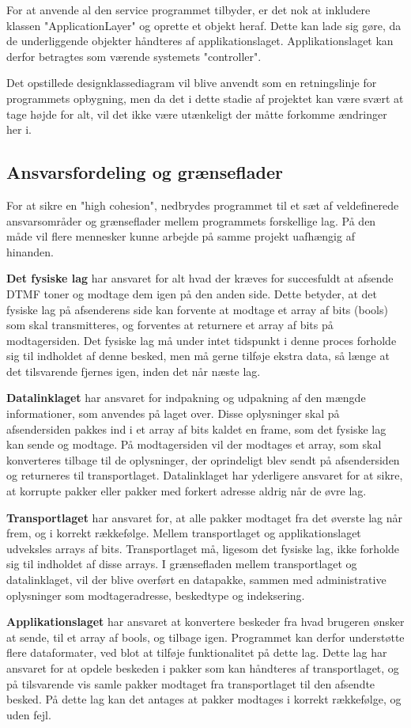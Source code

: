 For at anvende al den service programmet tilbyder, er det nok at inkludere klassen "ApplicationLayer" og oprette et objekt heraf. Dette kan lade sig gøre, da de underliggende objekter håndteres af applikationslaget. Applikationslaget kan derfor betragtes som værende systemets "controller".

Det opstillede designklassediagram vil blive anvendt som en retningslinje for programmets opbygning, men da det i dette stadie af projektet kan være svært at tage højde for alt, vil det ikke være utænkeligt der måtte forkomme ændringer her i.


\subsection{Ansvarsfordeling og grænseflader}
For at sikre en "high cohesion", nedbrydes programmet til et sæt af veldefinerede ansvarsområder og grænseflader mellem programmets forskellige lag. På den måde vil flere mennesker kunne arbejde på samme projekt uafhængig af hinanden.  

\textbf{Det fysiske lag} har ansvaret for alt hvad der kræves for succesfuldt at afsende DTMF toner og modtage dem igen på den anden side. Dette betyder, at det fysiske lag på afsenderens side kan forvente at modtage et array af bits (bools) som skal transmitteres, og forventes at returnere et array af bits på modtagersiden. Det fysiske lag må under intet tidspunkt i denne proces forholde sig til indholdet af denne besked, men må gerne tilføje ekstra data, så længe at det tilsvarende fjernes igen, inden det når næste lag.

\textbf{Datalinklaget} har ansvaret for indpakning og udpakning af den mængde informationer, som anvendes på laget over. Disse oplysninger skal på afsendersiden pakkes ind i et array af bits kaldet en frame, som det fysiske lag kan sende og modtage. På modtagersiden vil der modtages et array, som skal  konverteres tilbage til de oplysninger, der oprindeligt blev sendt på afsendersiden og returneres til transportlaget. 
Datalinklaget har yderligere ansvaret for at sikre, at korrupte pakker eller pakker med forkert adresse aldrig når de øvre lag.

\textbf{Transportlaget} har ansvaret for, at alle pakker modtaget fra det øverste lag når frem, og i korrekt rækkefølge. Mellem transportlaget og applikationslaget udveksles arrays af bits. Transportlaget må, ligesom det fysiske lag, ikke forholde sig til indholdet af disse arrays. I grænsefladen mellem transportlaget og datalinklaget, vil der blive overført en datapakke, sammen med administrative oplysninger som modtageradresse, beskedtype og indeksering. 

\textbf{Applikationslaget} har ansvaret at konvertere beskeder fra hvad brugeren ønsker at sende, til et array af bools, og tilbage igen. Programmet kan derfor understøtte flere dataformater, ved blot at tilføje funktionalitet på dette lag. 
Dette lag har ansvaret for at opdele beskeden i pakker som kan håndteres af transportlaget, og på tilsvarende vis samle pakker modtaget fra transportlaget til den afsendte besked. På dette lag kan det antages at pakker modtages i korrekt rækkefølge, og uden fejl. 